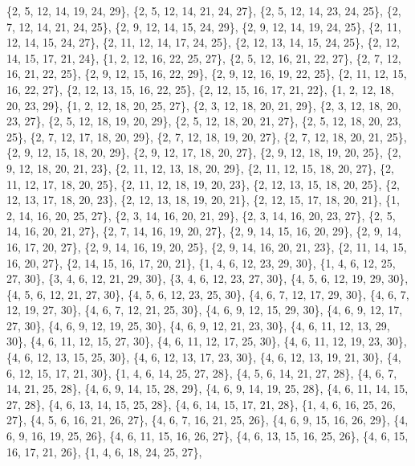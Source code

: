 \documentclass[11pt,a4paper]{article}
\begin{document}
{\{2, 5, 12, 14, 19, 24, 29\}, \{2, 5, 12, 14, 21, 24, 27\}, \{2, 5, 12, 14, 23, 24, 25\}, \{2, 7, 12, 14, 21, 24, 25\}, \{2, 9, 12, 14, 15, 24, 29\},
\{2, 9, 12, 14, 19, 24, 25\}, \{2, 11, 12, 14, 15, 24, 27\}, \{2, 11, 12, 14, 17, 24, 25\}, \{2, 12, 13, 14, 15, 24, 25\}, \{2, 12, 14, 15, 17, 21, 24\},
\{1, 2, 12, 16, 22, 25, 27\}, \{2, 5, 12, 16, 21, 22, 27\}, \{2, 7, 12, 16, 21, 22, 25\}, \{2, 9, 12, 15, 16, 22, 29\}, \{2, 9, 12, 16, 19, 22, 25\},
\{2, 11, 12, 15, 16, 22, 27\}, \{2, 12, 13, 15, 16, 22, 25\}, \{2, 12, 15, 16, 17, 21, 22\}, \{1, 2, 12, 18, 20, 23, 29\}, \{1, 2, 12, 18, 20, 25, 27\},
\{2, 3, 12, 18, 20, 21, 29\}, \{2, 3, 12, 18, 20, 23, 27\}, \{2, 5, 12, 18, 19, 20, 29\}, \{2, 5, 12, 18, 20, 21, 27\}, \{2, 5, 12, 18, 20, 23, 25\},
\{2, 7, 12, 17, 18, 20, 29\}, \{2, 7, 12, 18, 19, 20, 27\}, \{2, 7, 12, 18, 20, 21, 25\}, \{2, 9, 12, 15, 18, 20, 29\}, \{2, 9, 12, 17, 18, 20, 27\},
\{2, 9, 12, 18, 19, 20, 25\}, \{2, 9, 12, 18, 20, 21, 23\}, \{2, 11, 12, 13, 18, 20, 29\}, \{2, 11, 12, 15, 18, 20, 27\}, \{2, 11, 12, 17, 18, 20, 25\},
\{2, 11, 12, 18, 19, 20, 23\}, \{2, 12, 13, 15, 18, 20, 25\}, \{2, 12, 13, 17, 18, 20, 23\}, \{2, 12, 13, 18, 19, 20, 21\}, \{2, 12, 15, 17, 18, 20, 21\},
\{1, 2, 14, 16, 20, 25, 27\}, \{2, 3, 14, 16, 20, 21, 29\}, \{2, 3, 14, 16, 20, 23, 27\}, \{2, 5, 14, 16, 20, 21, 27\}, \{2, 7, 14, 16, 19, 20, 27\},
\{2, 9, 14, 15, 16, 20, 29\}, \{2, 9, 14, 16, 17, 20, 27\}, \{2, 9, 14, 16, 19, 20, 25\}, \{2, 9, 14, 16, 20, 21, 23\}, \{2, 11, 14, 15, 16, 20, 27\},
\{2, 14, 15, 16, 17, 20, 21\}, \{1, 4, 6, 12, 23, 29, 30\}, \{1, 4, 6, 12, 25, 27, 30\}, \{3, 4, 6, 12, 21, 29, 30\}, \{3, 4, 6, 12, 23, 27, 30\},
\{4, 5, 6, 12, 19, 29, 30\}, \{4, 5, 6, 12, 21, 27, 30\}, \{4, 5, 6, 12, 23, 25, 30\}, \{4, 6, 7, 12, 17, 29, 30\}, \{4, 6, 7, 12, 19, 27, 30\},
\{4, 6, 7, 12, 21, 25, 30\}, \{4, 6, 9, 12, 15, 29, 30\}, \{4, 6, 9, 12, 17, 27, 30\}, \{4, 6, 9, 12, 19, 25, 30\}, \{4, 6, 9, 12, 21, 23, 30\},
\{4, 6, 11, 12, 13, 29, 30\}, \{4, 6, 11, 12, 15, 27, 30\}, \{4, 6, 11, 12, 17, 25, 30\}, \{4, 6, 11, 12, 19, 23, 30\}, \{4, 6, 12, 13, 15, 25, 30\},
\{4, 6, 12, 13, 17, 23, 30\}, \{4, 6, 12, 13, 19, 21, 30\}, \{4, 6, 12, 15, 17, 21, 30\}, \{1, 4, 6, 14, 25, 27, 28\}, \{4, 5, 6, 14, 21, 27, 28\},
\{4, 6, 7, 14, 21, 25, 28\}, \{4, 6, 9, 14, 15, 28, 29\}, \{4, 6, 9, 14, 19, 25, 28\}, \{4, 6, 11, 14, 15, 27, 28\}, \{4, 6, 13, 14, 15, 25, 28\},
\{4, 6, 14, 15, 17, 21, 28\}, \{1, 4, 6, 16, 25, 26, 27\}, \{4, 5, 6, 16, 21, 26, 27\}, \{4, 6, 7, 16, 21, 25, 26\}, \{4, 6, 9, 15, 16, 26, 29\},
\{4, 6, 9, 16, 19, 25, 26\}, \{4, 6, 11, 15, 16, 26, 27\}, \{4, 6, 13, 15, 16, 25, 26\}, \{4, 6, 15, 16, 17, 21, 26\}, \{1, 4, 6, 18, 24, 25, 27\},
}
\end{document}
